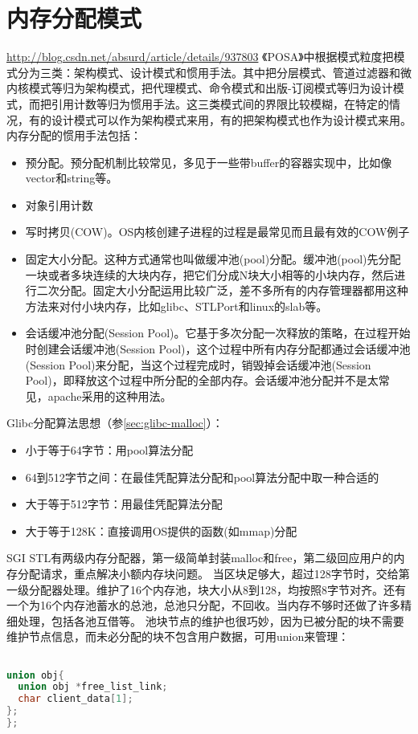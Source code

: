 \section{内存分配模式}
\label{sec:memallocidioms}
\url{http://blog.csdn.net/absurd/article/details/937803}
《POSA》中根据模式粒度把模式分为三类：架构模式、设计模式和惯用手法。其中把分层模式、管道过滤器和微内核模式等归为架构模式，把代理模式、命令模式和出版-订阅模式等归为设计模式，而把引用计数等归为惯用手法。这三类模式间的界限比较模糊，在特定的情况，有的设计模式可以作为架构模式来用，有的把架构模式也作为设计模式来用。
内存分配的惯用手法包括：
\begin{itemize}
\item 预分配。预分配机制比较常见，多见于一些带buffer的容器实现中，比如像vector和string等。
\item 对象引用计数
\item 写时拷贝(COW)。OS内核创建子进程的过程是最常见而且最有效的COW例子
\item 固定大小分配。这种方式通常也叫做缓冲池(pool)分配。缓冲池(pool)先分配一块或者多块连续的大块内存，把它们分成N块大小相等的小块内存，然后进行二次分配。固定大小分配运用比较广泛，差不多所有的内存管理器都用这种方法来对付小块内存，比如glibc、STLPort和linux的slab等。
\item 会话缓冲池分配(Session Pool)。它基于多次分配一次释放的策略，在过程开始时创建会话缓冲池(Session Pool)，这个过程中所有内存分配都通过会话缓冲池(Session Pool)来分配，当这个过程完成时，销毁掉会话缓冲池(Session Pool)，即释放这个过程中所分配的全部内存。会话缓冲池分配并不是太常见，apache采用的这种用法。
\end{itemize}

Glibc分配算法思想（参\ref{sec:glibc-malloc}）：
\begin{itemize}
\item 小于等于64字节：用pool算法分配
\item 64到512字节之间：在最佳凭配算法分配和pool算法分配中取一种合适的
\item 大于等于512字节：用最佳凭配算法分配
\item 大于等于128K：直接调用OS提供的函数(如mmap)分配
\end{itemize}


SGI STL有两级内存分配器，第一级简单封装malloc和free，第二级回应用户的内存分配请求，重点解决小额内存块问题。
当区块足够大，超过128字节时，交给第一级分配器处理。维护了16个内存池，块大小从8到128，均按照8字节对齐。还有一个为16个内存池蓄水的总池，总池只分配，不回收。当内存不够时还做了许多精细处理，包括各池互借等。
池块节点的维护也很巧妙，因为已被分配的块不需要维护节点信息，而未必分配的块不包含用户数据，可用union来管理：
\begin{lstlisting}[language=C++]

union obj{
  union obj *free_list_link;
  char client_data[1];
};
};

\end{lstlisting}

